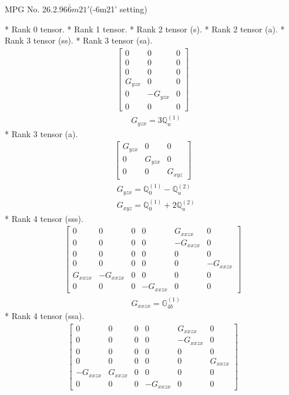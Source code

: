 \documentclass[fleqn,8pt,landscape]{jsarticle}
\begin{document}
\setcounter{MaxMatrixCols}{32}

\renewcommand{\tablename}{Table~}
\renewcommand{\figurename}{Figure~}
\begin{center}
\LARGE
MPG No. 26.2.96\quad$\bar{6}m21'$\quad(-6m21' setting)
\end{center}
* Rank 0 tensor.
* Rank 1 tensor.
* Rank 2 tensor (s).
* Rank 2 tensor (a).
* Rank 3 tensor (ss).
* Rank 3 tensor (sa).
\begin{align*}
\begin{bmatrix} 0 & 0 & 0 \\ 0 & 0 & 0 \\ 0 & 0 & 0 \\ G_{yzx} & 0 & 0 \\ 0 & - G_{yzx} & 0 \\ 0 & 0 & 0 \end{bmatrix}
\end{align*}
\begin{align*}
& G_{yzx} = 3 \mathbb{Q}_{u}^{(1)}
\end{align*}
* Rank 3 tensor (a).
\begin{align*}
\begin{bmatrix} G_{yzx} & 0 & 0 \\ 0 & G_{yzx} & 0 \\ 0 & 0 & G_{xyz} \end{bmatrix}
\end{align*}
\begin{align*}
& G_{yzx} = \mathbb{Q}_{0}^{(1)} - \mathbb{Q}_{u}^{(2)} \\
& G_{xyz} = \mathbb{Q}_{0}^{(1)} + 2 \mathbb{Q}_{u}^{(2)}
\end{align*}
* Rank 4 tensor (sss).
\begin{align*}
\begin{bmatrix} 0 & 0 & 0 & 0 & G_{xxzx} & 0 \\ 0 & 0 & 0 & 0 & - G_{xxzx} & 0 \\ 0 & 0 & 0 & 0 & 0 & 0 \\ 0 & 0 & 0 & 0 & 0 & - G_{xxzx} \\ G_{xxzx} & - G_{xxzx} & 0 & 0 & 0 & 0 \\ 0 & 0 & 0 & - G_{xxzx} & 0 & 0 \end{bmatrix}
\end{align*}
\begin{align*}
& G_{xxzx} = \mathbb{G}_{4b}^{(1)}
\end{align*}
* Rank 4 tensor (ssa).
\begin{align*}
\begin{bmatrix} 0 & 0 & 0 & 0 & G_{xxzx} & 0 \\ 0 & 0 & 0 & 0 & - G_{xxzx} & 0 \\ 0 & 0 & 0 & 0 & 0 & 0 \\ 0 & 0 & 0 & 0 & 0 & G_{xxzx} \\ - G_{xxzx} & G_{xxzx} & 0 & 0 & 0 & 0 \\ 0 & 0 & 0 & - G_{xxzx} & 0 & 0 \end{bmatrix}
\end{align*}
\end{document}
